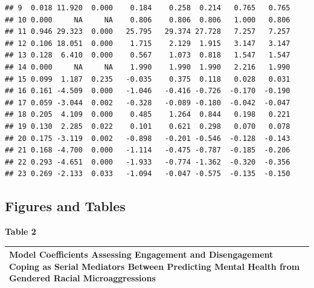 \documentclass[
  english,
]{book}
\begin{document}
\begin{verbatim}
## 9  0.018 11.920  0.000    0.184    0.258  0.214   0.765   0.765
## 10 0.000     NA     NA    0.806    0.806  0.806   1.000   0.806
## 11 0.946 29.323  0.000   25.795   29.374 27.728   7.257   7.257
## 12 0.106 18.051  0.000    1.715    2.129  1.915   3.147   3.147
## 13 0.128  6.410  0.000    0.567    1.073  0.818   1.547   1.547
## 14 0.000     NA     NA    1.990    1.990  1.990   2.216   1.990
## 15 0.099  1.187  0.235   -0.035    0.375  0.118   0.028   0.031
## 16 0.161 -4.509  0.000   -1.046   -0.416 -0.726  -0.170  -0.190
## 17 0.059 -3.044  0.002   -0.328   -0.089 -0.180  -0.042  -0.047
## 18 0.205  4.109  0.000    0.485    1.264  0.844   0.198   0.221
## 19 0.130  2.285  0.022    0.101    0.621  0.298   0.070   0.078
## 20 0.175 -3.119  0.002   -0.898   -0.201 -0.546  -0.128  -0.143
## 21 0.168 -4.700  0.000   -1.114   -0.475 -0.787  -0.185  -0.206
## 22 0.293 -4.651  0.000   -1.933   -0.774 -1.362  -0.320  -0.356
## 23 0.269 -2.133  0.033   -1.094   -0.047 -0.575  -0.135  -0.150
\end{verbatim}

\hypertarget{figures-and-tables-2}{%
\subsection{Figures and Tables}\label{figures-and-tables-2}}

\textbf{Table 2 }

\begin{longtable}[]{@{}
  >{\raggedright\arraybackslash}p{}@{}}
\toprule
Model Coefficients Assessing Engagement and Disengagement Coping as Serial Mediators Between Predicting Mental Health from Gendered Racial Microaggressions \\
\midrule
\endhead
\bottomrule
\end{longtable}
\end{document}
